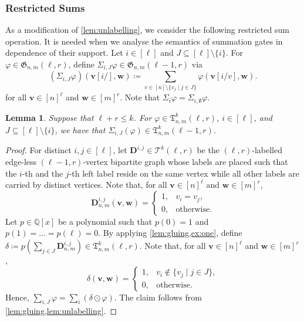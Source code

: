 \documentclass[11pt, DIV=15]{scrarticle}
\theoremstyle{definition}
\theoremstyle{plain}
\newtheorem{lemma}[definition]{Lemma}
\theoremstyle{remark}
\renewcommand{\phi}{\varphi}
\begin{document}
 	\subsubsection{Restricted Sums}
	As a modification of \cref{lem:unlabelling},
	we consider the following restricted sum operation.
	It is needed when we analyse the semantics of summation gates in dependence of their support.
	Let $i \in [\ell]$ and $J \subseteq [\ell] \setminus \{i\}$.
	For $\phi \in \mathfrak{G}_{n,m}(\ell, r)$,
	define $\Sigma_{i, J} \phi \in \mathfrak{G}_{n,m}(\ell-1, r)$
	via \[ (\Sigma_{i, J} \phi)(\boldsymbol{v}[i/], \boldsymbol{w}) \coloneqq \sum_{v \in [n] \setminus \{v_j \mid j \in J\}} \phi(\boldsymbol{v}[i/v], \boldsymbol{w}). \]
	for all $\boldsymbol{v} \in [n]^\ell$ and $\boldsymbol{w} \in [m]^r$.
	Note that $\Sigma_i \phi = \Sigma_{i, \emptyset} \phi$.
	
	\begin{lemma}\label{lem:sum-exclude-lincomb}
		Suppose that $\ell+r \leq k$.
		For $\phi \in \mathfrak{T}^k_{n,m}(\ell,r )$,  $i \in [\ell]$, and $J \subseteq [\ell] \setminus \{i\}$,
		we have that $\Sigma_{i, J} (\phi) \in \mathfrak{T}^k_{n,m}(\ell-1, r)$.
	\end{lemma}
	\begin{proof}
		For distinct $i, j \in [\ell]$, 
		let $\boldsymbol{D}^{i,j} \in \mathcal{T}^{k}(\ell, r)$ be the $(\ell, r)$-labelled edge-less $(\ell-1,r)$-vertex bipartite graph whose labels are placed such that the $i$-th and the $j$-th left label
		reside on the same vertex while all other labels are carried by distinct vertices.
		Note that, for all $\boldsymbol{v} \in [n]^{\ell}$ and $\boldsymbol{w} \in [m]^r$,
		\begin{equation}\label{eq:diell}
			\boldsymbol{D}^{i,j}_{n,m}(\boldsymbol{v}, \boldsymbol{w}) = \begin{cases}
				1,& v_i = v_j, \\
				0,& \text{otherwise}.
			\end{cases}
		\end{equation}
		Let $p \in \mathbb{Q}[x]$ be a polynomial such that $p(0) = 1$ and $p(1) = \dots = p(\ell) = 0$.
		By applying \cref{lem:gluing,ex:one},
		define $\delta \coloneqq p(\sum_{j \in J} \boldsymbol{D}^{i,j}_{n,m}) \in \mathfrak{T}^k_{n,m}(\ell, r)$.
		Note that, for all $\boldsymbol{v} \in [n]^{\ell}$ and $\boldsymbol{w} \in [m]^r$,
		\[
			\delta(\boldsymbol{v}, \boldsymbol{w}) = \begin{cases}
				1, & v_i  \not\in \{v_j \mid j \in J\},\\
				0, & \text{otherwise}.
			\end{cases}
		\]
		Hence, $\sum_{i, J} \phi = \sum_{i} (\delta \odot \phi)$.
		The claim follows from \cref{lem:gluing,lem:unlabelling}.
	\end{proof}
\end{document}
